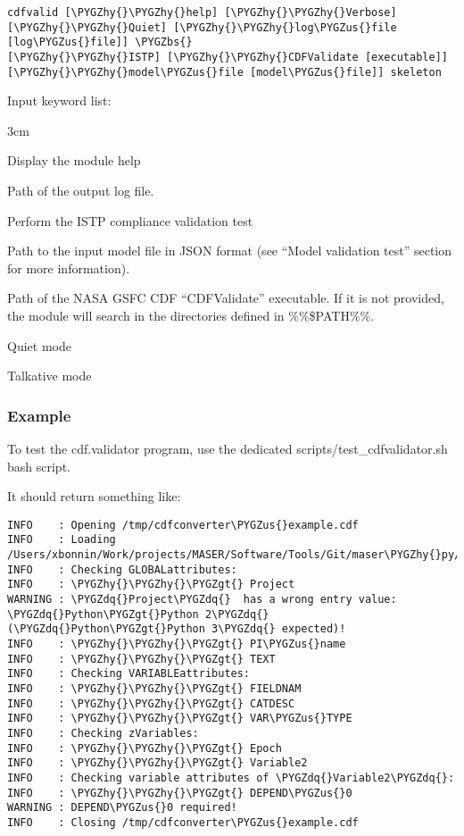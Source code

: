 \documentclass[letterpaper,10pt,english]{sphinxmanual}
\def\PYGZbs{\char`\\}
\def\PYGZus{\char`\_}
\def\PYGZgt{\char`\>}
\def\PYGZhy{\char`\-}
\def\PYGZdq{\char`\"}
\begin{document}
\begin{Verbatim}[commandchars=\\\{\}]
cdfvalid [\PYGZhy{}\PYGZhy{}help] [\PYGZhy{}\PYGZhy{}Verbose] [\PYGZhy{}\PYGZhy{}Quiet] [\PYGZhy{}\PYGZhy{}log\PYGZus{}file [log\PYGZus{}file]] \PYGZbs{}
[\PYGZhy{}\PYGZhy{}ISTP] [\PYGZhy{}\PYGZhy{}CDFValidate [executable]] [\PYGZhy{}\PYGZhy{}model\PYGZus{}file [model\PYGZus{}file]] skeleton
\end{Verbatim}

Input keyword list:
\begin{optionlist}{3cm}
\item [-h, -help]  
Display the module help
\item [-l, -{-}log\_file]  
Path of the output log file.
\item [-I, -{-}ISTP]  
Perform the ISTP compliance validation test
\item [-m, -{-}model\_file]  
Path to the input model file in JSON format
(see ``Model validation test'' section for more information).
\item [-C, -{-}CDFValidate executable]  
Path of the NASA GSFC CDF ``CDFValidate'' executable.
If it is not provided, the module will
search in the directories defined in \%\%\$PATH\%\%.
\item [-Q, -{-}Quiet]  
Quiet mode
\item [-V, -{-}Verbose]  
Talkative mode
\end{optionlist}


\subsubsection{Example}
\label{cdf:id6}
To test the cdf.validator program, use the dedicated scripts/test\_cdfvalidator.sh bash script.

It should return something like:

\begin{Verbatim}[commandchars=\\\{\}]
INFO    : Opening /tmp/cdfconverter\PYGZus{}example.cdf
INFO    : Loading /Users/xbonnin/Work/projects/MASER/Software/Tools/Git/maser\PYGZhy{}py/scripts/../maser/support/cdf/cdfvalidator\PYGZus{}model\PYGZus{}example.json
INFO    : Checking GLOBALattributes:
INFO    : \PYGZhy{}\PYGZhy{}\PYGZgt{} Project
WARNING : \PYGZdq{}Project\PYGZdq{}  has a wrong entry value: \PYGZdq{}Python\PYGZgt{}Python 2\PYGZdq{} (\PYGZdq{}Python\PYGZgt{}Python 3\PYGZdq{} expected)!
INFO    : \PYGZhy{}\PYGZhy{}\PYGZgt{} PI\PYGZus{}name
INFO    : \PYGZhy{}\PYGZhy{}\PYGZgt{} TEXT
INFO    : Checking VARIABLEattributes:
INFO    : \PYGZhy{}\PYGZhy{}\PYGZgt{} FIELDNAM
INFO    : \PYGZhy{}\PYGZhy{}\PYGZgt{} CATDESC
INFO    : \PYGZhy{}\PYGZhy{}\PYGZgt{} VAR\PYGZus{}TYPE
INFO    : Checking zVariables:
INFO    : \PYGZhy{}\PYGZhy{}\PYGZgt{} Epoch
INFO    : \PYGZhy{}\PYGZhy{}\PYGZgt{} Variable2
INFO    : Checking variable attributes of \PYGZdq{}Variable2\PYGZdq{}:
INFO    : \PYGZhy{}\PYGZhy{}\PYGZgt{} DEPEND\PYGZus{}0
WARNING : DEPEND\PYGZus{}0 required!
INFO    : Closing /tmp/cdfconverter\PYGZus{}example.cdf
\end{Verbatim}
\end{document}

